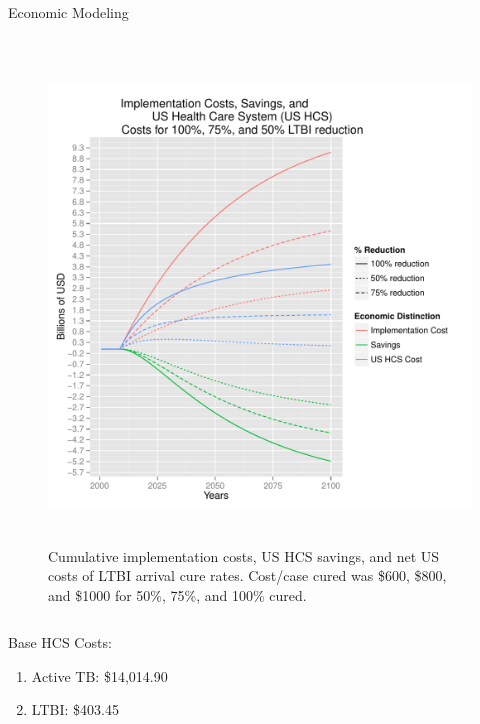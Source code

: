 \documentclass[final]{beamer}
\begin{document}
\begin{frame}
\begin{columns}
\begin{column}{.3\textwidth}
\begin{block}{Economic Modeling}
\begin{block}{}
          \vspace{-4em}
          \begin{column}{.66\textwidth}
            \begin{figure}[h]
              \begin{center}
                \includegraphics[width=\textwidth,height=13cm]{EnLTBIRedGroupCost.pdf}
              \end{center}
              \caption{Cumulative implementation costs, US HCS savings, and net
                       US costs of LTBI arrival cure rates. Cost/case cured was
                       \$600, \$800, and \$1000 for 50\%, 75\%, and 100\%
                       cured.}
              \label{fig:redEnLTBI_costs}
            \end{figure}
          \end{column}
          \begin{column}{.26\textwidth}
            Base HCS Costs:
            \begin{enumerate}
              \item Active TB: \$14,014.90
              \item LTBI: \$403.45
            \end{enumerate}
          \end{column}
        \end{block}
      \end{block}

\end{column}
\end{columns}
\end{frame}
\end{document}
